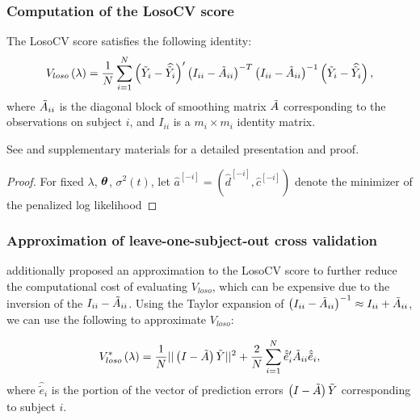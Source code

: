   \subsubsection{Computation of the LosoCV score}
  
  \begin{lemma} \label{lemma:losocv-shortcut}
  The LosoCV score satisfies the following identity:
  \begin{equation*}
 V_{loso}\left( \lambda \right) = \frac{1}{N} \sum_{i = 1}^N \left(\tilde{Y}_i - \widehat{\tilde{Y}_i}\right)' \left(I_{ii} - \tilde{A}_{ii}\right)^{-T}\left(I_{ii} - \tilde{A}_{ii}\right)^{-1}\left(\tilde{Y}_i - \widehat{\tilde{Y}_i}\right),
  \end{equation*}
  \noindent
  where $\tilde{A}_{ii}$ is the diagonal block of smoothing matrix $\tilde{A}$ corresponding to the observations on subject $i$, and $I_{ii}$ is a $m_i \times m_i$ identity matrix.
\end{lemma}

See \citet{xu2012asymptotic} and supplementary materials \citet{xuasymptotic} for a detailed presentation and proof.  

\begin{proof} \label{proof:losocv-shortcut}
For fixed $\lambda$, $\mbox{\boldmath $\theta$}$, $\sigma^2\left(t \right)$, let $\hat{a}^{\left[-i\right]} = \left(\hat{d}^{\left[-i\right]}, \hat{c}^{\left[-i\right]}\right)$ denote the minimizer of the penalized log likelihood 
\end{proof}  

\subsubsection{Approximation of leave-one-subject-out cross validation}
  
\citet{xu2012asymptotic} additionally proposed an approximation to the LosoCV score to further reduce the computational cost of evaluating $V_{loso}$, which can be expensive due to the inversion of the $I_{ii} - \tilde{A}_{ii}$. Using the Taylor expansion of $\left(I_{ii} - \tilde{A}_{ii}\right)^{-1} \approx I_{ii} + \tilde{A}_{ii}$, we can use the following to approximate $V_{loso}$:

\begin{equation} \label{eq:approx-losocv}
V_{loso}^*\left( \lambda \right) = \frac{1}{N} \vert \vert \left(I - \tilde{A}\right)\tilde{Y} \vert \vert^2 + \frac{2}{N} \sum_{i = 1}^N \hat{\tilde{e}}'_{i}\tilde{A}_{ii}\hat{\tilde{e}}_i,
\end{equation}
\noindent
where $\hat{\tilde{e}}_i$ is the portion of the vector of prediction errors $\left(I - \tilde{A}\right)\tilde{Y}$ corresponding to subject $i$.   

